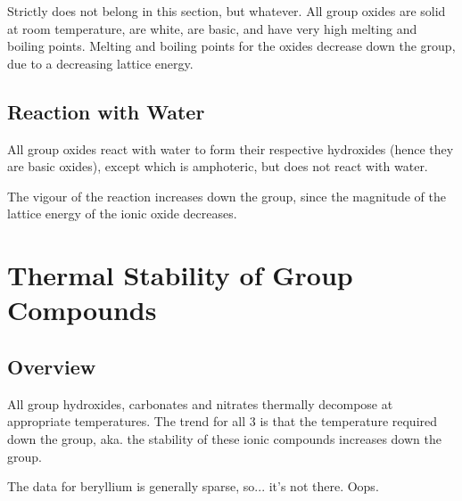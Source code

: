 			Strictly does not belong in this section, but whatever. All group \rtwo{} oxides are solid at room
			temperature, are white, are basic, and have very high melting and boiling points. Melting and
			boiling points for the oxides decrease down the group, due to a decreasing lattice energy.



		\subsection{Reaction with Water}

			All group \rtwo{} oxides react with water to form their respective hydroxides (hence they are basic
			oxides), except  which is amphoteric, but does not react with water.

			The vigour of the reaction increases down the group, since the magnitude of the lattice energy
			of the ionic oxide decreases.





	\section{Thermal Stability of Group  Compounds}

		\subsection{Overview}

			All group \rtwo{} hydroxides, carbonates and nitrates thermally decompose at appropriate
			temperatures. The trend for all 3 is that the temperature required  down
			the group, aka. the stability of these ionic compounds increases down the group.

			The data for beryllium is generally sparse, so... it's not there. Oops.

